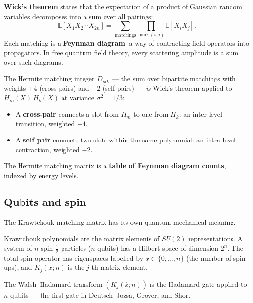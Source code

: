 \documentclass[11pt,a4paper]{article}
\theoremstyle{plain}
\theoremstyle{definition}
\begin{document}
\begin{tcolorbox}[breakable, colback=yellow!10, colframe=yellow!10,
  boxrule=0pt, sharp corners]
\textbf{Wick's theorem} states that the expectation of a product of
Gaussian random variables decomposes into a sum over all pairings:
\[
  \mathbb{E}[X_1 X_2 \cdots X_{2n}]
  = \sum_{\text{matchings}} \prod_{\text{pairs } (i,j)}
    \mathbb{E}[X_i X_j].
\]
Each matching is a \textbf{Feynman diagram}: a way of contracting
field operators into propagators. In free quantum field theory,
every scattering amplitude is a sum over such diagrams.

The Hermite matching integer $D_{mk}$ --- the sum over bipartite
matchings with weights $+4$ (cross-pairs) and $-2$ (self-pairs) ---
\emph{is} Wick's theorem applied to $H_m(X)\, H_k(X)$ at variance
$\sigma^2 = 1/3$:
\begin{itemize}
\item A \textbf{cross-pair} connects a slot from $H_m$ to one from
  $H_k$: an inter-level transition, weighted $+4$.
\item A \textbf{self-pair} connects two slots within the same
  polynomial: an intra-level contraction, weighted $-2$.
\end{itemize}
The Hermite matching matrix is a \textbf{table of Feynman diagram
counts}, indexed by energy levels.
\end{tcolorbox}

\subsection{Qubits and spin}

\begin{tcolorbox}[breakable, colback=yellow!10, colframe=yellow!10,
  boxrule=0pt, sharp corners]
The Krawtchouk matching matrix has its own quantum mechanical
meaning.

Krawtchouk polynomials are the matrix elements of $SU(2)$
representations. A system of $n$ spin-$\tfrac12$ particles ($n$
qubits) has a Hilbert space of dimension $2^n$. The total spin
operator has eigenspaces labelled by $x \in \{0,\ldots,n\}$ (the
number of spin-ups), and $K_j(x;n)$ is the $j$-th matrix element.

The Walsh--Hadamard transform $(K_j(k;n))$ is the Hadamard gate
applied to $n$ qubits --- the first gate in Deutsch--Jozsa, Grover,
and Shor.
\end{tcolorbox}
\end{document}
